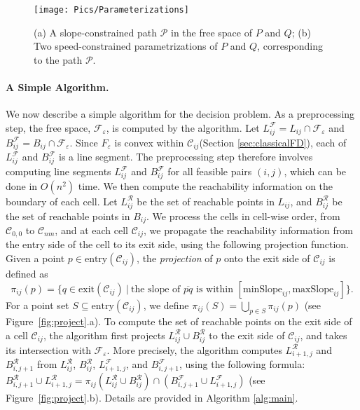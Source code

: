 \documentclass[12pt]{dalthesis}
\newcommand{\set}[1]{{\{ #1 \}}}
\newcommand{\eps}{\varepsilon}
\newcommand{\CF}{{\mathscr F}}
\newcommand{\CR}{{\mathscr R}}
\newcommand{\CP}{{\mathscr P}}
\newcommand{\CC}{{\mathscr C}}
\newcommand{\SC}{slope-constrained }
\newcommand{\cell}[1]{{\CC_{#1}}}
\newcommand{\Feps}{\CF_\eps}
\newcommand{\LF}{L^\CF}
\newcommand{\BF}{B^\CF}
\newcommand{\LR}{L^\CR}
\newcommand{\BR}{B^\CR}
\newcommand{\minS}[1]{\mbox{minSlope}_{#1}}
\newcommand{\maxS}[1]{\mbox{maxSlope}_{#1}}
\newcommand{\entry}[1]{\mbox{entry}(\cell{#1})}
\newcommand{\exit}[1]{\mbox{exit}(\cell{#1})}
\newcommand{\proj}[1]{\pi_{#1}}
\begin{document}
\begin{figure}[t]
	\centering
	\texttt{[image: Pics/Parameterizations]}
	\caption{
	(a) A \SC path $\CP$ in the free space of $P$ and $Q$;
	(b) Two speed-constrained parametrizations of $P$ and $Q$,
	corresponding to the path $\CP$.}
	\label{fig:parametrizations}
\end{figure}





\paragraph{A Simple Algorithm.}
We now describe a simple algorithm for the decision problem.
As a preprocessing step, the free space, $\Feps$, is computed by the algorithm.
Let $\LF_{ij} = L_{ij} \cap \Feps$ and $\BF_{ij} = B_{ij} \cap \Feps$.
Since $F_\eps$ is convex within $\cell{ij}$(Section \ref{sec:classicalFD}),
each of $\LF_{ij}$ and $\BF_{ij}$ is a line segment. 
The preprocessing step therefore involves computing line segments
$\LF_{ij}$ and $\BF_{ij}$ for all feasible pairs $(i,j)$, which can be done in $O(n^2)$ time.
We then compute the reachability information on the boundary of each cell.
Let $\LR_{ij}$ be the set of reachable points in $L_{ij}$,
and $\BR_{ij}$ be the set of reachable points in $B_{ij}$.
We process the cells in cell-wise order, from $\cell{0,0}$ to $\cell{nm}$,
and at each cell $\cell{ij}$, we propagate the reachability information 
from the entry side of the cell to its exit side, using the following projection function. 
Given a point $p \in \entry{ij}$, the {\em projection} of $p$ onto the exit side of $\cell{ij}$ is defined as
\[
	\proj{ij}(p) = \set{ q \in \exit{ij} \ |  \  \mbox{the slope of $\overline{pq}$ is within } [\minS{ij}, \maxS{ij}]  }.
\]
For a point set $S \subseteq \entry{ij}$, we define 
$ \proj{ij}(S) =\bigcup_{p\in S} \proj{ij}(p)$
(see Figure~\ref{fig:project}.a).
To compute the set of reachable points on the exit side of a cell $\cell{ij}$,
the algorithm first projects $\LR_{ij} \cup \BR_{ij}$ to the exit side of $\cell{ij}$,
and takes its intersection with $\Feps$.
More precisely, the algorithm computes 
 $\LR_{i+1,j}$ and $\BR_{i,j+1}$ from
$\LR_{ij}$, $\BR_{ij}$, $\LF_{i+1,j}$, and $\BF_{i,j+1}$, using the following formula:
$\BR_{i,j+1} \cup \LR_{i+1,j} = \proj{ij}(\LR_{ij} \cup \BR_{ij}) \cap (\BF_{i,j+1} \cup \LF_{i+1,j})$
(see Figure~\ref{fig:project}.b).
Details are provided in Algorithm \ref{alg:main}.
\end{document}
